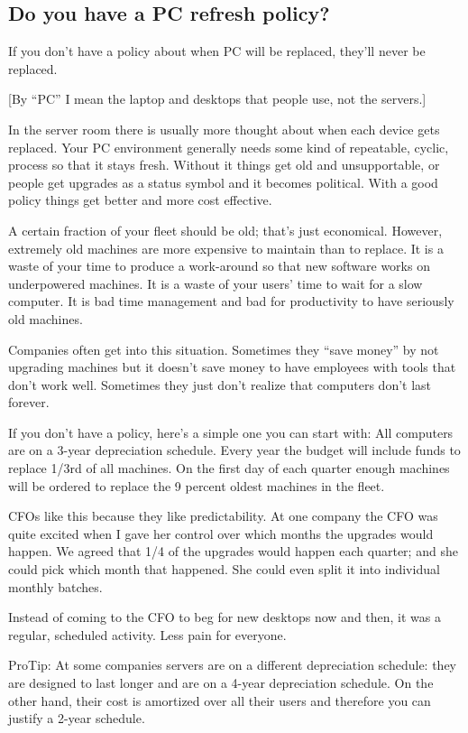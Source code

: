 \documentclass{article}
\begin{document}
\subsection{Do you have a PC refresh policy?}
If you don't have a policy about when PC will be replaced, they'll never be replaced.

[By ``PC'' I mean the laptop and desktops that people use, not the servers.]

In the server room there is usually more thought about when each device gets replaced. Your PC environment generally needs some kind of repeatable, cyclic, process so that it stays fresh. Without it things get old and unsupportable, or people get upgrades as a status symbol and it becomes political. With a good policy things get better and more cost effective.

A certain fraction of your fleet should be old; that's just economical. However, extremely old machines are more expensive to maintain than to replace. It is a waste of your time to produce a work-around so that new software works on underpowered machines. It is a waste of your users' time to wait for a slow computer. It is bad time management and bad for productivity to have seriously old machines.

Companies often get into this situation. Sometimes they ``save money'' by not upgrading machines but it doesn't save money to have employees with tools that don't work well. Sometimes they just don't realize that computers don't last forever.

If you don't have a policy, here's a simple one you can start with: All computers are on a 3-year depreciation schedule. Every year the budget will include funds to replace 1/3rd of all machines. On the first day of each quarter enough machines will be ordered to replace the 9 percent oldest machines in the fleet.

CFOs like this because they like predictability. At one company the CFO was quite excited when I gave her control over which months the upgrades would happen. We agreed that 1/4 of the upgrades would happen each quarter; and she could pick which month that happened. She could even split it into individual monthly batches.

Instead of coming to the CFO to beg for new desktops now and then, it was a regular, scheduled activity. Less pain for everyone.

ProTip: At some companies servers are on a different depreciation schedule: they are designed to last longer and are on a 4-year depreciation schedule. On the other hand, their cost is amortized over all their users and therefore you can justify a 2-year schedule.
\end{document}
